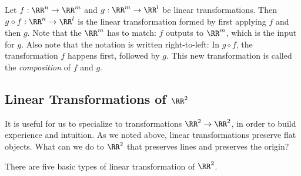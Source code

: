 \documentclass[fleqn]{report}
\begin{document}
\begin{defn}
Let $f : \RR^n \rightarrow \RR^m$ and $g: \RR^m \rightarrow
\RR^l$ be linear transformations. Then $g \circ f : \RR^n
\rightarrow \RR^l$ is the linear transformation formed by first
applying $f$ and then $g$. Note that the $\RR^m$ has to match:
$f$ outputs to $\RR^m$, which is the input for $g$. Also note
that the notation is written right-to-left: In $g \circ f$, the
transformation $f$ happens first, followed by $g$. This new
transformation is called the \emph{composition} of $f$ and $g$.
\end{defn}

\subsection{Linear Transformations of $\RR^2$}
\label{transformations-r2}

It is useful for us to specialize to transformations $\RR^2
\rightarrow \RR^2$, in order to build experience and intuition.
As we noted above, linear transformations preserve flat
objects. What can we do to $\RR^2$ that preserves lines and
preserves the origin?  

\begin{prop}
There are five basic types of linear transformation of $\RR^2$.
\end{prop}
\end{document}
